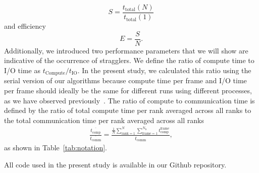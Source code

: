 \begin{equation}
  \label{eq:speedup}
  S = \frac{t_{\text{total}}(N)}{t_{\text{total}}(1)}
\end{equation}
and efficiency
\begin{equation}
  \label{eq:efficiency}
  E = \frac{S}{N}.
\end{equation}
Additionally, we introduced two performance parameters that we will show are indicative of the occurrence of stragglers.
We define the ratio of compute time to I/O time as $t_{\text{Compute}}/t_{\text{IO}}$. 
In the present study, we calculated this ratio using the serial version of our algorithms because compute time per frame and I/O time per frame should ideally be the same for different runs using different processes, as we have observed previously~\cite{Khoshlessan:2017ab}.
The ratio of compute to communication time is defined by the ratio of total compute time per rank averaged across all ranks to the total communication time per rank averaged across all ranks 
\begin{gather}
  \label{eq:Compute-comm}
  \frac{\overline{t_{\text{comp}}}}{\overline{t_{\text{comm}}}} = \frac{\frac{1}{N}
    \sum_{\text{rank}=1}^{N} \sum_{\text{frame}=1}^{N_{\text{b}}}t_{\text{comp}}^{\text{frame}}}%
  {\overline{t_{\text{comm}}}},
\end{gather}
as shown in Table~\ref{tab:notation}.
 
All code used in the present study is available in our Github repository. 
 
